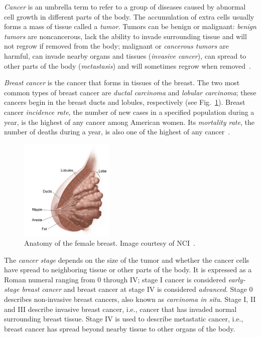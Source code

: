 \emph{Cancer} is an umbrella term to refer to a group of diseases caused by abnormal cell growth in different parts of the body. The accumulation of extra cells usually forms a mass of tissue called a \emph{tumor}. Tumors can be benign or malignant: \emph{benign tumors} are noncancerous, lack the ability to invade surrounding tissue and will not regrow if removed from the body;  malignant or \emph{cancerous tumors} are harmful, can invade nearby organs and tissues (\emph{invasive cancer}), can spread to other parts of the body (\emph{metastasis}) and will sometimes regrow when removed~\cite{WYNTKABreastCancer2012}.

\emph{Breast cancer} is the cancer that forms in tissues of the breast. The two most common types of breast cancer are \emph{ductal carcinoma} and \emph{lobular carcinoma}; these cancers begin in the breast ducts and lobules, respectively (see Fig.~\ref{fig:BreastAnatomy}). Breast cancer \emph{incidence rate}, the number of new cases in a specified population during a year, is the highest of any cancer among American women. Its \emph{mortality rate}, the number of deaths during a year, is also one of the highest of any cancer~\cite{Howlader2014}.

\begin{figure}[h]
	\centering
	\includegraphics[width = 0.4\textwidth]{plots/breastAnatomy.png}
	\caption[Female Breast Anatomy]{Anatomy of the female breast. Image courtesy of NCI~\cite{WYNTKABreastCancer2012}.}
	\label{fig:BreastAnatomy}
\end{figure}

The \emph{cancer stage} depends on the size of the tumor and whether the cancer cells have spread to neighboring tissue or other parts of the body. It is expressed as a Roman numeral ranging from 0 through IV; stage I cancer is considered \emph{early-stage breast cancer} and breast cancer at stage IV is considered \emph{advanced}. Stage 0 describes non-invasive breast cancers, also known as \emph{carcinoma in situ}. Stage I, II and III describe invasive breast cancer, i.e., cancer that has invaded normal surrounding breast tissue. Stage IV is used to describe metastatic cancer, i.e., breast cancer has spread beyond nearby tissue to other organs of the body.
